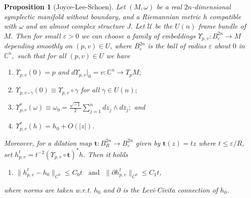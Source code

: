 \documentclass[12pt,leqno]{amsart}%
\theoremstyle{plain}
\newtheorem{proposition}{Proposition}[section]
\numberwithin{equation}{section}
\theoremstyle{definition}
\begin{document}


\begin{proposition}
[Joyce-Lee-Schoen]\label{Darboux} Let $(M,\omega)$ be a real $2n$-dimensional
symplectic manifold without boundary, and a Riemannian metric $h$ compatible
with $\omega$ and an almost complex structure $J$. Let $\mathcal{U}$ be the
$U(n)$ frame bundle of $M$. Then for small $\varepsilon>0$ we can choose a
family of embeddings $\Upsilon_{p,v}:B^{2n}_{\varepsilon}\rightarrow M$ depending
smoothly on $\left(p,v\right)  \in U$, where $B^{2n}_{\varepsilon}$ is the ball
of radius $\varepsilon$ about $0$ in $\mathbb{C}^{n},$ such that for all
$\left(  p,v\right)  \in U$ we have

\begin{enumerate}
\item $\Upsilon_{p,v}(0)=p$ and $d\Upsilon_{p,v}|_{0}=v:\mathbb{C}%
^{n}\rightarrow T_{p}M;$

\item $\Upsilon_{p,v\circ\gamma}(0)\equiv\Upsilon_{p,v}\circ\gamma$ for all
$\gamma\in U(n);$

\item $\Upsilon_{p,v}^{\ast}(\omega)\equiv\omega_{0}=\frac{\sqrt{-1}}{2}
\sum_{j=1}^{n}dz_{j}\wedge d\bar{z}_{j};$ and

\item $\Upsilon^{*}_{p,v}(h) = h_{0} +O(|z|)$.

\end{enumerate}

Moreover, for a dilation map $\mathbf{t}:B^{2n}_{R}\to B^{2n}_{\varepsilon}$ given by
$\mathbf{t}(z)=tz$ where $t\leq\varepsilon/R$, set $h^{t}_{p,v} =
t^{-2}(\Upsilon_{p,v}\circ\mathbf{t})^{*}h$. Then it holds

\begin{enumerate}
\item[(5)] $\|h^{t}_{p,v}-h_{0}\|_{C^{0}} \leq C_{0} t \ \ \ \ \mbox{and}
\ \ \ \|\partial h^{t}_{p,v}\|_{C^{0}}\leq C_{1} t$,
\end{enumerate}

where norms are taken w.r.t. $h_{0}$ and $\partial$ is the Levi-Civita
connection of $h_{0}$.
\end{proposition}
\end{document}
